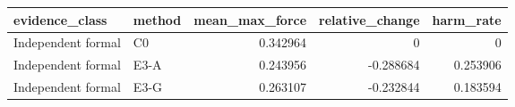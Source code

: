 \begin{tabular}{llrrr}
\toprule
evidence_class & method & mean_max_force & relative_change & harm_rate \\
\midrule
Independent formal & C0 & 0.342964 & 0 & 0 \\
Independent formal & E3-A & 0.243956 & -0.288684 & 0.253906 \\
Independent formal & E3-G & 0.263107 & -0.232844 & 0.183594 \\
\bottomrule
\end{tabular}
